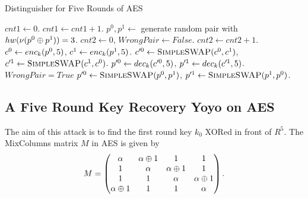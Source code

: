 \documentclass[twoside]{article}
\begin{document}
\begin{algorithm}
    \caption{Distinguisher for Five Rounds of AES}
    \label{alg:aes-5-rounds}
    \begin{algorithmic}[1]
        \State \(cnt1 \gets 0\).
            \State \(cnt1 \gets cnt1 + 1\).
            \State \(p^0, p^1 \gets\) generate random pair with
            \(hw(\nu(p^0 \oplus p^1)) = 3\).
            \State \(cnt2 \gets 0\), \(WrongPair \gets False\).
                \State \(cnt2 \gets cnt2 + 1\).
                \State \(c^0 \gets enc_k(p^0, 5)\), \(c^1 \gets
                enc_k(p^1, 5)\).
                \State \(c^{\prime 0} \gets \textsc{SimpleSWAP}(c^0,
                c^1)\), \(c^{\prime 1} \gets \textsc{SimpleSWAP}(c^1,
                c^0)\).
                \State \(p^{\prime 0} \gets dec_k(c^{\prime 0}, 5)\),
                \(p^{\prime 1} \gets dec_k(c^{\prime 1}, 5)\).
                        \State \(WrongPair = True\)
                    \EndIf
                \EndFor
                \State \(p^{\prime 0} \gets \textsc{SimpleSWAP}(p^0,
                p^1)\), \(p^{\prime 1} \gets \textsc{SimpleSWAP}(p^1,
                p^0)\).
            \EndWhile
                \State {} 
            \EndIf
        \EndWhile
        \State {}
    \end{algorithmic}
\end{algorithm}

\subsection{A Five Round Key Recovery Yoyo on AES}

The aim of this attack is to find the first round key \(k_0\) XORed in front
of \(R^5\). The MixColumns matrix \(M\) in AES is given by
\begin{equation}
    M = \begin{pmatrix}
        \alpha & \alpha \oplus 1 & 1 & 1 \\
        1 & \alpha & \alpha \oplus 1 & 1 \\
        1 & 1 & \alpha & \alpha \oplus 1 \\
        \alpha \oplus 1 & 1 & 1 & \alpha
    \end{pmatrix}.
\end{equation}
\end{document}
